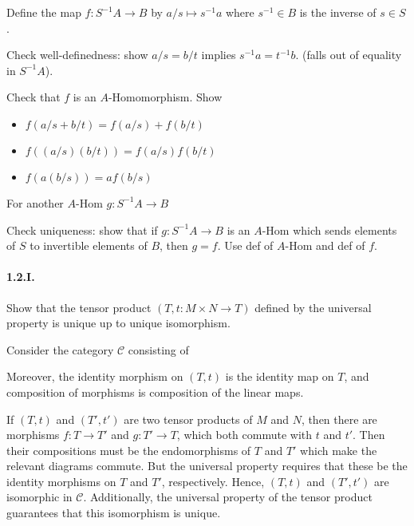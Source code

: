 \documentclass[12pt]{article}
\newlength{\myparskip}
\newenvironment{fullbox}{\begin{lrbox}{\savefullbox}\begin{minipage}{\dimexpr\textwidth-2\fboxsep\relax}\setlength{\parskip}{\myparskip}}{\end{minipage}\end{lrbox}\framebox[\textwidth]{\usebox{\savefullbox}}}
\newenvironment{pbox}[1][]{\begin{fullbox}\def\temp{#1}\ifx\temp\empty\else\paragraph{#1}\phantom{}\fi}{\end{fullbox}}
\theoremstyle{definition}
\newenvironment{cd}{\begin{center}\begin{tikzcd}}{\end{tikzcd}\end{center}}
\newcommand{\<}{\langle}
\renewcommand{\>}{\rangle}
\newcommand{\CC}{\mathcal{C}}
\begin{document}
Define the map $f : S^{-1}A \to B$ by $a/s \mapsto s^{-1}a$ where $s^{-1} \in B$ is the inverse of $s \in S$.

Check well-definedness: show $a/s = b/t$ implies  $s^{-1}a = t^{-1}b$. (falls out of equality in $S^{-1}A$).

Check that $f$ is an $A$-Homomorphism.
Show
\begin{itemize}
    \item $f(a/s + b/t) = f(a/s) + f(b/t)$
    \item $f((a/s)(b/t)) = f(a/s)f(b/t)$
    \item $f(a(b/s)) = af(b/s)$
\end{itemize}

For another $A$-Hom $g : S^{-1}A \to B$

Check uniqueness: show that if $g : S^{-1}A \to B$ is an $A$-Hom which sends elements of $S$ to invertible elements of $B$, then $g = f$.
Use def of $A$-Hom and def of $f$.

\begin{pbox}[1.2.I.]
    Show that the tensor product $(T, t : M \times N \to T)$ defined by the universal property is unique up to unique isomorphism.
\end{pbox}

Consider the category $\CC$ consisting of
Moreover, the identity morphism on $(T, t)$ is the identity map on $T$, and composition of morphisms is composition of the linear maps.

If $(T, t)$ and $(T', t')$ are two tensor products of $M$ and $N$, then there are morphisms $f : T \to T'$ and $g : T' \to T$, which both commute with $t$ and $t'$.
Then their compositions must be the endomorphisms of $T$ and $T'$ which make the relevant diagrams commute.
But the universal property requires that these be the identity morphisms on $T$ and $T'$, respectively.
Hence, $(T, t)$ and $(T', t')$ are isomorphic in $\CC$.
Additionally, the universal property of the tensor product guarantees that this isomorphism is unique.
\end{document}

